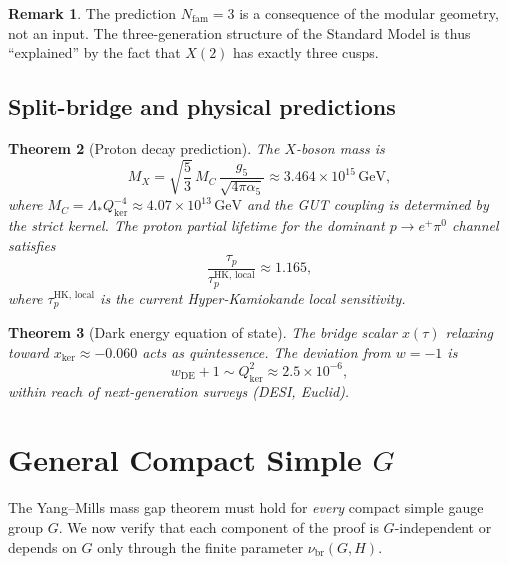 \documentclass[12pt]{article}
\theoremstyle{plain}
\newtheorem{theorem}{Theorem}[section]
\theoremstyle{definition}
\newtheorem{remark}[theorem]{Remark}
\numberwithin{equation}{section}
\newcommand{\br}{\mathrm{br}}
\newcommand{\kker}{\mathrm{ker}}
\begin{document}
\begin{remark}
The prediction $N_{\mathrm{fam}}=3$ is a consequence of the modular geometry, not an input.  The three-generation structure of the Standard Model is thus ``explained'' by the fact that $X(2)$ has exactly three cusps.
\end{remark}

\subsection{Split-bridge and physical predictions}

\begin{theorem}[Proton decay prediction]\label{thm:protondecay}
The $X$-boson mass is
\begin{equation}
M_X = \sqrt{\frac{5}{3}}\,M_C\,\frac{g_5}{\sqrt{4\pi\alpha_5}} \approx 3.464\times 10^{15}\,\mathrm{GeV},
\end{equation}
where $M_C=\Lambda_* Q_{\kker}^{-4}\approx 4.07\times 10^{13}\,\mathrm{GeV}$ and the GUT coupling is determined by the strict kernel.  The proton partial lifetime for the dominant $p\to e^+\pi^0$ channel satisfies
\begin{equation}
\frac{\tau_p}{\tau_p^{\mathrm{HK,\,local}}} \approx 1.165,
\end{equation}
where $\tau_p^{\mathrm{HK,\,local}}$ is the current Hyper-Kamiokande local sensitivity.
\end{theorem}

\begin{theorem}[Dark energy equation of state]\label{thm:darkenergyeos}
The bridge scalar $x(\tau)$ relaxing toward $x_{\kker}\approx -0.060$ acts as quintessence.  The deviation from $w=-1$ is
\begin{equation}
w_{\mathrm{DE}}+1 \sim Q_{\kker}^2 \approx 2.5\times 10^{-6},
\end{equation}
within reach of next-generation surveys (DESI, Euclid).
\end{theorem}

\section{General Compact Simple $G$}\label{sec:generalG}

The Yang--Mills mass gap theorem must hold for \emph{every} compact simple gauge group $G$.  We now verify that each component of the proof is $G$-independent or depends on $G$ only through the finite parameter $\nu_{\br}(G,H)$.
\end{document}
